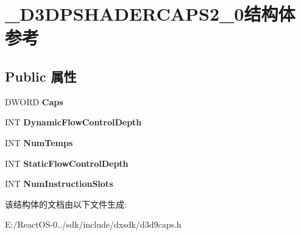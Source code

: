 \hypertarget{struct___d3_d_p_s_h_a_d_e_r_c_a_p_s2__0}{}\section{\+\_\+\+D3\+D\+P\+S\+H\+A\+D\+E\+R\+C\+A\+P\+S2\+\_\+0结构体 参考}
\label{struct___d3_d_p_s_h_a_d_e_r_c_a_p_s2__0}
\subsection*{Public 属性}
\begin{DoxyCompactItemize}
\item 
\mbox{\label{struct___d3_d_p_s_h_a_d_e_r_c_a_p_s2__0_a0c56fcd8b427e43c722d9ae0e261dbaf}} 
D\+W\+O\+RD {\bfseries Caps}
\item 
\mbox{\label{struct___d3_d_p_s_h_a_d_e_r_c_a_p_s2__0_adf4e748c33c6f97c2f9f272c92eb0521}} 
I\+NT {\bfseries Dynamic\+Flow\+Control\+Depth}
\item 
\mbox{\label{struct___d3_d_p_s_h_a_d_e_r_c_a_p_s2__0_ace6a6f348b75e7a2fd82f62eb77faaa2}} 
I\+NT {\bfseries Num\+Temps}
\item 
\mbox{\label{struct___d3_d_p_s_h_a_d_e_r_c_a_p_s2__0_a0f662349b33658601dbb2adb7d5443c0}} 
I\+NT {\bfseries Static\+Flow\+Control\+Depth}
\item 
\mbox{\label{struct___d3_d_p_s_h_a_d_e_r_c_a_p_s2__0_a9564c9c4bcbc96dc916306e9d72a2375}} 
I\+NT {\bfseries Num\+Instruction\+Slots}
\end{DoxyCompactItemize}


该结构体的文档由以下文件生成\+:\begin{DoxyCompactItemize}
\item 
E\+:/\+React\+O\+S-\/0../sdk/include/dxsdk/d3d9caps.\+h\end{DoxyCompactItemize}
